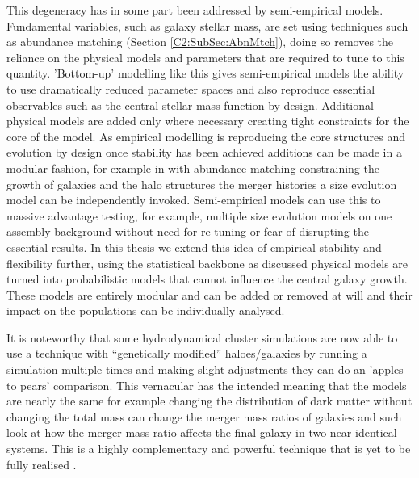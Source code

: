 This degeneracy has in some part been addressed by semi-empirical models. Fundamental variables, such as galaxy stellar mass, are set using techniques such as abundance matching (Section \ref{C2:SubSec:AbnMtch}), doing so removes the reliance on the physical models and parameters that are required to tune to this quantity. 'Bottom-up' modelling like this gives semi-empirical models the ability to use dramatically reduced parameter spaces and also reproduce essential observables such as the central stellar mass function by design. Additional physical models are added only where necessary creating tight constraints for the core of the model. As empirical modelling is reproducing the core structures and evolution
by design once stability has been achieved additions can be made in a modular fashion, for example in \citet{Shankar2014} with abundance matching constraining the growth of galaxies and the halo structures the merger histories a size evolution model can be independently invoked. Semi-empirical models can use this to massive advantage testing, for example, multiple size evolution models on one assembly background without need for re-tuning or fear of disrupting the essential results. In this thesis we extend this idea of empirical stability and flexibility further, using the statistical backbone as discussed physical models are turned into probabilistic models that cannot influence the central galaxy growth. These models are entirely modular and can be added or removed at will and their impact on the populations can be individually analysed. 

It is noteworthy that some hydrodynamical cluster simulations are now able to use a technique with ``genetically modified'' haloes/galaxies by running a simulation multiple times and making slight adjustments they can do an 'apples to pears' comparison. This vernacular has the intended meaning that the models are nearly the same for example changing the distribution of dark matter without changing the total mass can change the merger mass ratios of galaxies and such look at how the merger mass ratio affects the final galaxy in two near-identical systems. This is a highly complementary and powerful technique that is yet to be fully realised \cite{Rey2018QuadraticHistory}.

